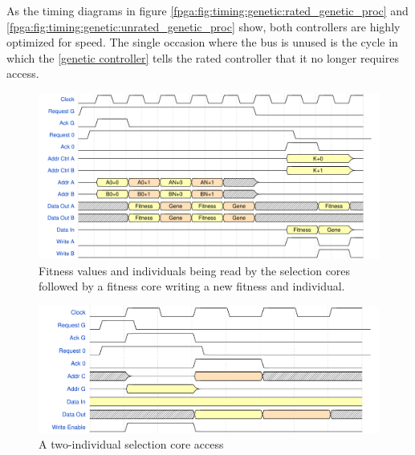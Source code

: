 As the timing diagrams in figure \vref{fpga:fig:timing:genetic:rated_genetic_proc} and \vref{fpga:fig:timing:genetic:unrated_genetic_proc} show, both controllers are highly optimized for speed. The single occasion where the bus is unused is the cycle in which the \ref{genetic controller} tells the \gls{rated controller} that it no longer requires access.

\begin{figure}[H]
  \centering
  \includegraphics[width=\textwidth]{fpga/fig/timing/rated_genetic_proc.pdf}
  \caption{Fitness values and individuals being read by the selection cores followed by a fitness core writing a new fitness and individual.}
  \label{fpga:fig:timing:genetic:rated_genetic_proc}
\end{figure}

\begin{figure}[H]
  \centering
  \includegraphics[width=\textwidth]{fpga/fig/timing/unrated_genetic_proc.pdf}
  \caption{A two-individual selection core access }
  \label{fpga:fig:timing:genetic:unrated_genetic_proc}
\end{figure}

